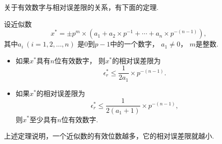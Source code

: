 关于有效数字与相对误差限的关系，有下面的定理.
\begin{theorem}
设近似数\begin{equation*}
	x^*
	= \pm p^m \times (
		a_1
		+ a_2 \times p^{-1}
		+ \dotsb
		+ a_n \times p^{-(n-1)}
	),
\end{equation*}
其中\(a_i\ (i=1,2,\dotsc,n)\)
是\(0\)到\(p-1\)中的一个数字，
\(a_1\neq0\)，
\(m\)是整数.
\begin{itemize}
	\item 如果\(x^*\)具有\(n\)位有效数字，
	则\(x^*\)的相对误差限为\begin{equation}
		\epsilon^*_r
		\leq \frac1{2 a_1} \times p^{-(n-1)}.
	\end{equation}

	\item 如果\(x^*\)的相对误差限为\begin{equation*}
		\epsilon^*_r
		\leq \frac1{2(a_1+1)} \times p^{-(n-1)},
	\end{equation*}
	则\(x^*\)至少具有\(n\)位有效数字.
\end{itemize}
\end{theorem}
上述定理说明，一个近似数的有效位数越多，它的相对误差限就越小.
